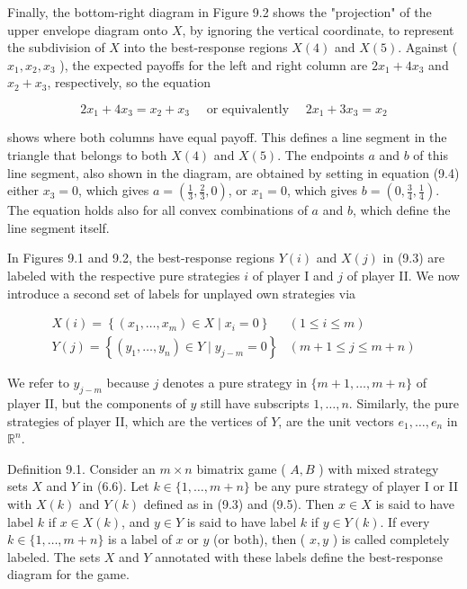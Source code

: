 \documentclass[12pt]{article}
\begin{document}
Finally, the bottom-right diagram in Figure 9.2 shows the "projection" of the upper envelope diagram onto $X$, by ignoring the vertical coordinate, to represent the subdivision of $X$ into the best-response regions $X(4)$ and $X(5)$. Against ( $x_{1}, x_{2}, x_{3}$ ), the expected payoffs for the left and right column are $2 x_{1}+4 x_{3}$ and $x_{2}+x_{3}$, respectively, so the equation


\begin{equation*}
2 x_{1}+4 x_{3}=x_{2}+x_{3} \quad \text { or equivalently } \quad 2 x_{1}+3 x_{3}=x_{2} \tag{9.4}
\end{equation*}


shows where both columns have equal payoff. This defines a line segment in the triangle that belongs to both $X(4)$ and $X(5)$. The endpoints $a$ and $b$ of this line segment, also shown in the diagram, are obtained by setting in equation (9.4) either $x_{3}=0$, which gives $a=\left(\frac{1}{3}, \frac{2}{3}, 0\right)$, or $x_{1}=0$, which gives $b=\left(0, \frac{3}{4}, \frac{1}{4}\right)$. The equation holds also for all convex combinations of $a$ and $b$, which define the line segment itself.

In Figures 9.1 and 9.2, the best-response regions $Y(i)$ and $X(j)$ in (9.3) are labeled with the respective pure strategies $i$ of player I and $j$ of player II. We now introduce a second set of labels for unplayed own strategies via

\[
\begin{array}{ll}
X(i)=\left\{\left(x_{1}, \ldots, x_{m}\right) \in X \mid x_{i}=0\right\} & (1 \leq i \leq m) \\
Y(j)=\left\{\left(y_{1}, \ldots, y_{n}\right) \in Y \mid y_{j-m}=0\right\} & (m+1 \leq j \leq m+n) \tag{9.5}
\end{array}
\]

We refer to $y_{j-m}$ because $j$ denotes a pure strategy in $\{m+1, \ldots, m+n\}$ of player II, but the components of $y$ still have subscripts $1, \ldots, n$. Similarly, the pure strategies of player II, which are the vertices of $Y$, are the unit vectors $e_{1}, \ldots, e_{n}$ in $\mathbb{R}^{n}$.

Definition 9.1. Consider an $m \times n$ bimatrix game ( $A, B$ ) with mixed strategy sets $X$ and $Y$ in (6.6). Let $k \in\{1, \ldots, m+n\}$ be any pure strategy of player I or II with $X(k)$ and $Y(k)$ defined as in (9.3) and (9.5). Then $x \in X$ is said to have label $k$ if $x \in X(k)$, and $y \in Y$ is said to have label $k$ if $y \in Y(k)$. If every $k \in\{1, \ldots, m+n\}$ is a label of $x$ or $y$ (or both), then ( $x, y$ ) is called completely labeled. The sets $X$ and $Y$ annotated with these labels define the best-response diagram for the game.
\end{document}
